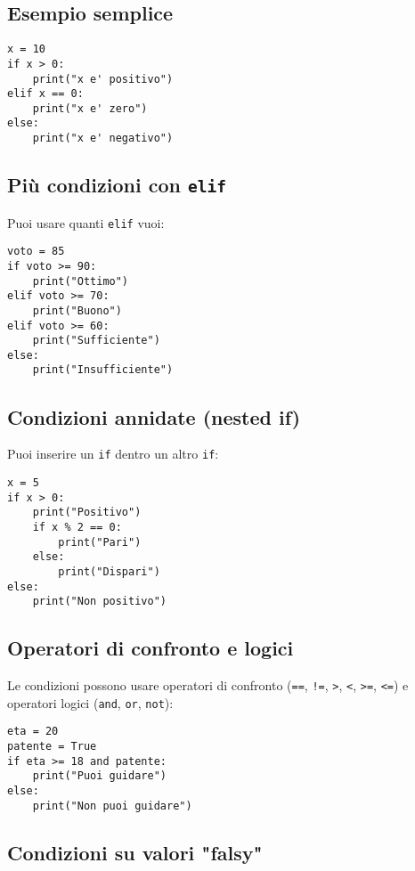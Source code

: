 \documentclass[a4paper,12pt]{article}
\begin{document}
\subsection*{Esempio semplice}

\begin{lstlisting}
x = 10
if x > 0:
    print("x e' positivo")
elif x == 0:
    print("x e' zero")
else:
    print("x e' negativo")
\end{lstlisting}

\subsection*{Più condizioni con \texttt{elif}}

Puoi usare quanti \texttt{elif} vuoi:
\begin{lstlisting}
voto = 85
if voto >= 90:
    print("Ottimo")
elif voto >= 70:
    print("Buono")
elif voto >= 60:
    print("Sufficiente")
else:
    print("Insufficiente")
\end{lstlisting}

\subsection*{Condizioni annidate (nested if)}

Puoi inserire un \texttt{if} dentro un altro \texttt{if}:
\begin{lstlisting}
x = 5
if x > 0:
    print("Positivo")
    if x % 2 == 0:
        print("Pari")
    else:
        print("Dispari")
else:
    print("Non positivo")
\end{lstlisting}

\subsection*{Operatori di confronto e logici}

Le condizioni possono usare operatori di confronto (\texttt{==}, \texttt{!=}, \texttt{>}, \texttt{<}, \texttt{>=}, \texttt{<=}) e operatori logici (\texttt{and}, \texttt{or}, \texttt{not}):
\begin{lstlisting}
eta = 20
patente = True
if eta >= 18 and patente:
    print("Puoi guidare")
else:
    print("Non puoi guidare")
\end{lstlisting}

\subsection*{Condizioni su valori "falsy"}
\end{document}
